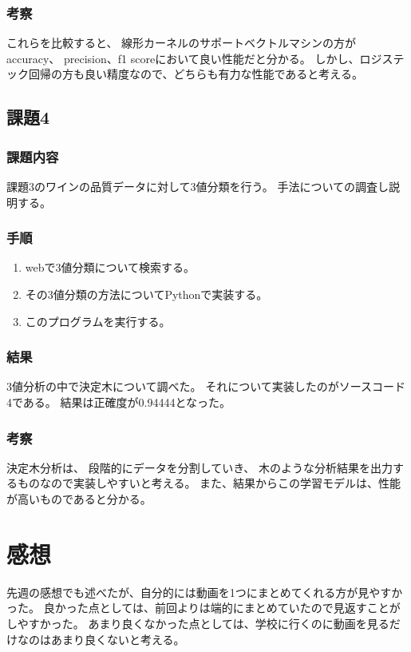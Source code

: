 \documentclass[12pt]{jarticle}
\begin{document}
\subsubsection*{考察}

これらを比較すると、
線形カーネルのサポートベクトルマシンの方がaccuracy、
precision、f1 scoreにおいて良い性能だと分かる。
しかし、ロジステック回帰の方も良い精度なので、どちらも有力な性能であると考える。

\subsection{課題4}
\subsubsection*{課題内容}
課題3のワインの品質データに対して3値分類を行う。
手法についての調査し説明する。

\subsubsection*{手順}
\begin{enumerate}
    \item webで3値分類について検索する。
    \item その3値分類の方法についてPythonで実装する。
    \item このプログラムを実行する。
\end{enumerate}

\subsubsection*{結果}
3値分析の中で決定木について調べた。
それについて実装したのがソースコード4である。
結果は正確度が0.94444となった。

\subsubsection*{考察}
決定木分析は、
段階的にデータを分割していき、
木のような分析結果を出力するものなので実装しやすいと考える。
また、結果からこの学習モデルは、性能が高いものであると分かる。


\section{感想}
先週の感想でも述べたが、自分的には動画を1つにまとめてくれる方が見やすかった。
良かった点としては、前回よりは端的にまとめていたので見返すことがしやすかった。
あまり良くなかった点としては、学校に行くのに動画を見るだけなのはあまり良くないと考える。
\end{document}
